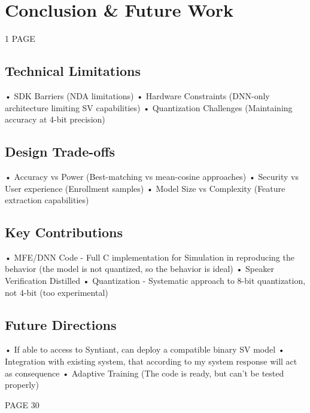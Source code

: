 \chapter{Conclusion \& Future Work}

1 PAGE\newline\newline

\label{cha:conclusion}
\section{Technical Limitations}
\label{sec:technical limits}
• SDK Barriers (NDA limitations)\newline
• Hardware Constraints (DNN-only architecture limiting SV capabilities)\newline
• Quantization Challenges (Maintaining accuracy at 4-bit precision)\newline

\section{Design Trade-offs}
\label{sec:design trade-offs}
• Accuracy vs Power (Best-matching vs mean-cosine approaches)\newline
• Security vs User experience (Enrollment samples)\newline
• Model Size vs Complexity (Feature extraction capabilities)\newline

\section{Key Contributions}
\label{sec:key contributions}
• MFE/DNN Code - Full C implementation for Simulation in reproducing the behavior (the model is not quantized, so the behavior is ideal)\newline 
• Speaker Verification Distilled\newline 
• Quantization - Systematic approach to 8-bit quantization, not 4-bit (too experimental)\newline 

\section{Future Directions}
\label{sec:future directions}
• If able to access to Syntiant, can deploy a compatible binary SV model\newline 
• Integration with existing system, that according to my system response will act as consequence\newline
• Adaptive Training (The code is ready, but can't be tested properly)\newline\newline

PAGE 30

\newpage